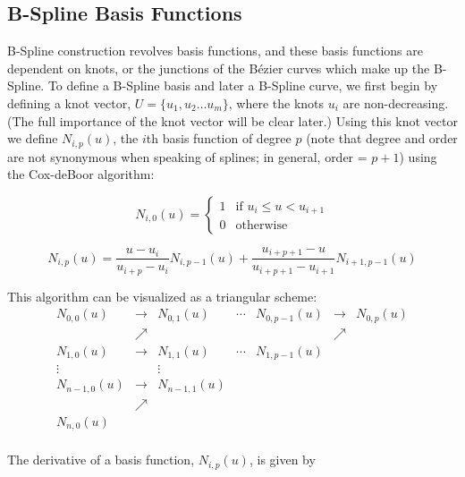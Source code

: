 \subsection{B-Spline Basis Functions}
B-Spline construction revolves basis functions, and these basis functions are dependent on knots, or the junctions of the Bézier curves which make up the B-Spline. To define a B-Spline basis and later a B-Spline curve, we first begin by defining a knot vector, $U = \{u_1, u_2  \ldots u_{m}\}$, where the knots $u_i$ are non-decreasing.  (The full importance of the knot vector will be clear later.) Using this knot vector we define $N_{i,p}(u)$, the $i$th basis function of degree $p$ (note that degree and order are not synonymous when speaking of splines; in general, order = $p+1$) using the Cox-deBoor algorithm:

\begin{equation} 
N_{i,0}(u) = 
\begin{cases} 
1 & \text{if  } u_i \leq u < u_{i+1} \\
0 & \text{otherwise}
\end{cases} 
\end{equation}

\begin{equation} N_{i,p}(u) = \frac{u-u_i}{u_{i+p}-u_i} N_{i,p-1}(u) + \frac{u_{i+p+1}-u}{u_{i+p+1}-u_{i+1}}N_{i+1,p-1}(u) \end{equation}

\bigskip

This algorithm can be visualized as a triangular scheme:
\begin{equation}
\begin{matrix}
	N_{0,0}(u) & \rightarrow & N_{0,1}(u) & \cdots & N_{0,p-1}(u) & \rightarrow & N_{0,p}(u)\\ 
	& \nearrow &  &  &  & \nearrow & \\ 
	N_{1,0}(u) & \rightarrow & N_{1,1}(u) & \cdots & N_{1,p-1}(u) &  & \\ 
	\vdots &  & \vdots &  &  &  & \\ 
	N_{n-1,0}(u) & \rightarrow & N_{n-1,1}(u) &  &  &  & \\ 
	& \nearrow &  &  &  &  & \\ 
	N_{n,0}(u) &  &  &  &  &  & \\ 
\end{matrix}
\end{equation}

The derivative of a basis function, $N_{i,p}(u)$, is given by

